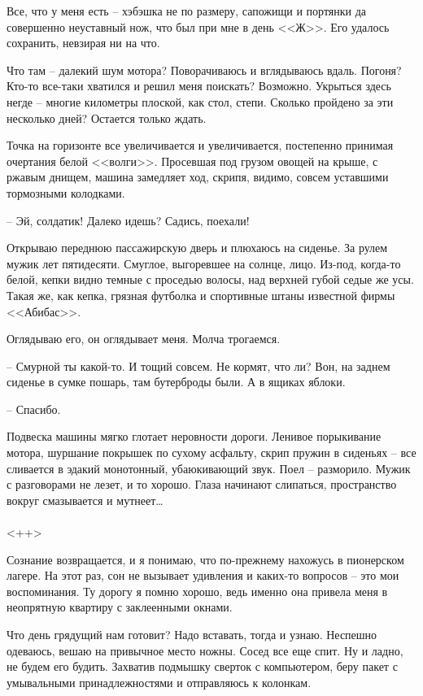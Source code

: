 \documentclass[a4paper]{book}
\begin{document}
Все, что у меня есть -- хэбэшка не по размеру, сапожищи и портянки да совершенно неуставный нож, что был при мне в день <<Ж>>. Его удалось сохранить, невзирая ни на что.

Что там -- далекий шум мотора? Поворачиваюсь и вглядываюсь вдаль. Погоня? Кто-то все-таки хватился и решил меня поискать? Возможно. Укрыться здесь негде -- многие километры плоской, как стол, степи. Сколько пройдено за эти несколько дней? Остается только ждать.

Точка на горизонте все увеличивается и увеличивается, постепенно принимая очертания белой <<волги>>. Просевшая под грузом овощей на крыше, с ржавым днищем, машина замедляет ход, скрипя, видимо, совсем уставшими тормозными колодками.

-- Эй, солдатик! Далеко идешь? Садись, поехали!

Открываю переднюю пассажирскую дверь и плюхаюсь на сиденье. За рулем мужик лет пятидесяти. Смуглое, выгоревшее на солнце, лицо. Из-под, когда-то белой, кепки видно темные с проседью волосы, над верхней губой седые же усы. Такая же, как кепка, грязная футболка и спортивные штаны известной фирмы <<Абибас>>.

Оглядываю его, он оглядывает меня. Молча трогаемся.

-- Смурной ты какой-то. И тощий совсем. Не кормят, что ли? Вон, на заднем сиденье в сумке пошарь, там бутерброды были. А в ящиках яблоки.

-- Спасибо.

Подвеска машины мягко глотает неровности дороги. Ленивое порыкивание мотора, шуршание покрышек по сухому асфальту, скрип пружин в сиденьях -- все сливается в эдакий монотонный, убаюкивающий звук. Поел --  разморило. Мужик с разговорами не лезет, и то хорошо. Глаза начинают слипаться, пространство вокруг смазывается и мутнеет\ldots
\\
\paragraph{}<++>

Сознание возвращается, и я понимаю, что по-прежнему нахожусь в пионерском лагере. На этот раз, сон не вызывает удивления и каких-то вопросов -- это мои воспоминания. Ту дорогу я помню хорошо, ведь именно она привела меня в неопрятную квартиру с заклеенными окнами.

Что день грядущий нам готовит? Надо вставать, тогда и узнаю. Неспешно одеваюсь, вешаю на привычное место ножны. Сосед все еще спит. Ну и ладно, не будем его будить. Захватив подмышку сверток с компьютером, беру пакет с умывальными принадлежностями и отправляюсь к колонкам. 
\end{document}
